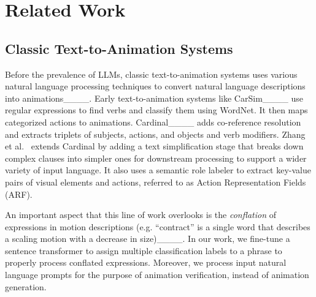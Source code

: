 \section{Related Work}
\label{sec:related}


\subsection{Classic Text-to-Animation Systems}
Before the prevalence of LLMs, classic text-to-animation systems uses various natural language processing techniques to convert natural language descriptions into animations____.
%
Early text-to-animation systems like CarSim____ use regular expressions to find verbs and classify them using WordNet.
It then maps categorized actions to animations.
%
Cardinal____ adds co-reference resolution and extracts triplets of subjects, actions, and objects and verb modifiers.
%
Zhang et al.~ extends Cardinal by adding a text simplification stage that breaks down complex clauses into simpler ones for downstream processing to support a wider variety of input language.
It also uses a semantic role labeler to extract key-value pairs of visual elements and actions, referred to as Action Representation Fields (ARF).

An important aspect that this line of work overlooks is the \textit{conflation} of expressions in motion descriptions (e.g. ``contract'' is a single word that describes a scaling motion with a decrease in size)____.
In our work, we fine-tune a sentence transformer to assign multiple classification labels to a phrase to properly process conflated expressions.
Moreover, we process input natural language prompts for the purpose of animation verification, instead of animation generation.


